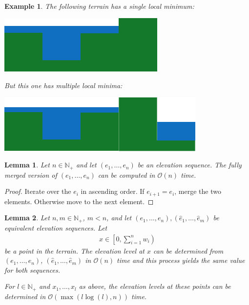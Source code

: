 \documentclass[11pt,a4paper]{article}
\newtheorem{lem}{Lemma}
\newtheorem{ex}{Example}
\newcommand{\Np}{\mathbb{N}_+}
\newcommand{\bO}{\mathcal{O}}
\begin{document}
\begin{ex}
  The following terrain has a single local minimum:
  \begin{center}
    \includegraphics{im3.pdf}
  \end{center}
  But this one has multiple local minima:
  \begin{center}
    \includegraphics{im4.pdf}
  \end{center}
\end{ex}

\begin{lem}
    Let $n\in\Np$ and let $(e_1,\ldots,e_n)$ be an elevation sequence.
    The fully merged version of $(e_1,\ldots,e_n)$ can be computed in $\bO(n)$ time.
\end{lem}

\begin{proof}
    Iterate over the $e_i$ in ascending order.
    If $e_{i+1} = e_i$, merge the two elements.
    Otherwise move to the next element.
\end{proof}

\begin{lem}
\label{retrieval}
  Let $n,m\in\Np$, $m < n$, and let $(e_1,\ldots,e_n), (\hat{e}_1,\ldots,\hat{e}_m)$ be equivalent elevation sequences. Let
  \begin{align*}
      x \in \left[0, \sum_{i=1}^n w_i\right)
  \end{align*}
  be a point in the terrain.
  The elevation level at $x$ can be determined from $(e_1,\ldots,e_n)$, $(\hat{e}_1,\ldots,\hat{e}_m)$ in $\bO(n)$ time and this process yields the same value for both sequences.

  For $l\in\Np$ and $x_1,\ldots,x_l$ as above, the elevation levels at these points can be determined
  in $\bO(\max(l\log(l), n))$ time.
\end{lem}
\end{document}
